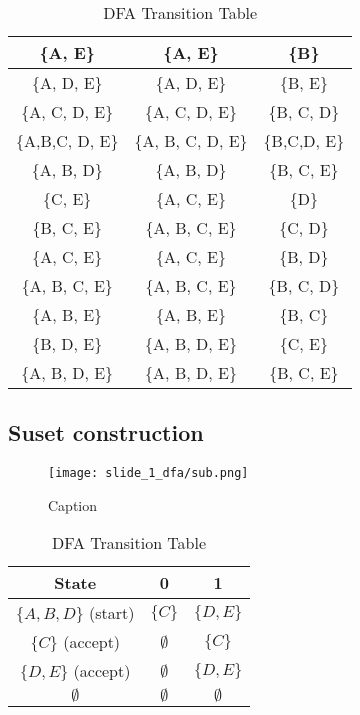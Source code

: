 \documentclass[8pt]{article}
\begin{document}
\begin{table}[H]
\begin{tabular}{|c|c|c|}
        \hline
        \{A, E\} & \{A, E\} & \{B\} \\
        \hline
        \{A, D, E\} & \{A, D, E\} & \{B, E\} \\
        \hline
        \{A, C, D, E\} & \{A, C, D, E\} & \{B, C, D\} \\
        \hline
        \{A,B,C, D, E\} & \{A, B, C, D, E\} & \{B,C,D, E\} \\
        \hline
        \{A, B, D\} & \{A, B, D\} & \{B, C, E\} \\
        \hline
        \{C, E\} & \{A, C, E\} & \{D\} \\
        \hline
        \{B, C, E\} & \{A, B, C, E\} & \{C, D\} \\
        \hline
        \{A, C, E\} & \{A, C, E\} & \{B, D\} \\
        \hline
        \{A, B, C, E\} & \{A, B, C, E\} & \{B, C, D\} \\
        \hline
        \{A, B, E\} & \{A, B, E\} & \{B, C\} \\
        \hline
        \{B, D, E\} & \{A, B, D, E\} & \{C, E\} \\
        \hline
        \{A, B, D, E\} & \{A, B, D, E\} & \{B, C, E\} \\
        \hline
        
    \end{tabular}
    \caption{DFA Transition Table}
    \label{tab:dfa_transition}
\end{table}
\subsection{Suset construction}
\begin{figure}[H]
    \centering
    \texttt{[image: slide\_1\_dfa/sub.png]}
    \caption{Caption}
    \label{fig:placeholder}
\end{figure}
\begin{table}[H]
\centering
\begin{tabular}{|c|c|c|}
\hline
\textbf{State} & \textbf{0} & \textbf{1} \\
\hline
$\{A,B,D\}$ (start) & $\{C\}$ & $\{D,E\}$ \\
\hline
$\{C\}$ (accept) & $\emptyset$ & $\{C\}$ \\
\hline
$\{D,E\}$ (accept) & $\emptyset$ & $\{D,E\}$ \\
\hline
$\emptyset$ & $\emptyset$ & $\emptyset$ \\
\hline
\end{tabular}
\caption{DFA Transition Table}
\end{table}
\end{document}

